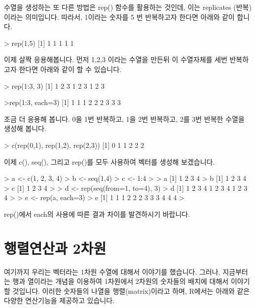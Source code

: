 수열을 생성하는 또 다른 방법은 rep() 함수를 활용하는 것인데, 이는 replicates (반복)이라는 의미입니다.
따라서, 1이라는 숫자를 5 번 반복하고자 한다면 아래와 같이 합니다. 

\begin{Schunk}
\begin{Soutput}
> rep(1,5)
[1] 1 1 1 1 1
\end{Soutput}
\end{Schunk}

이제 살짝 응용해봅니다.  
먼저 1,2,3 이라는 수열을 만든뒤 이 수열자체를 세번 반복하고자 한다면 아래와 같이 할 수 있습니다. 

\begin{Schunk}
\begin{Soutput}
> rep(1:3, 3)
[1] 1 2 3 1 2 3 1 2 3	
\end{Soutput}
\end{Schunk}
>rep(1:3, each=3)
[1] 1 1 1 2 2 2 3 3 3

조금 더 응용해 봅니다. 
0을 1번 반복하고, 1을 2번 반복하고, 2를 3번 반복한 수열을 생성해 봅니다. 

\begin{Schunk}
\begin{Soutput}
> c(rep(0,1), rep(1,2), rep(2,3))
[1] 0 1 1 2 2 2
\end{Soutput}
\end{Schunk}

이제 c(), seq(), 그리고 rep()를 모두 사용하여 벡터를 생성해 보겠습니다.

\begin{Schunk}
\begin{Soutput}
> a <- c(1, 2, 3, 4)
> b <- seq(1,4)
> c <- 1:4
>
> a
[1] 1 2 3 4
> b
[1] 1 2 3 4
> c
[1] 1 2 3 4
>
> d <- rep(seq(from=1, to=4), 3)
> d
[1] 1 2 3 4 1 2 3 4 1 2 3 4
>
> e <- rep(a, each=3)
> e
[1] 1 1 1 2 2 2 3 3 3 4 4 4
>
\end{Soutput}
\end{Schunk}

rep()에서 each의 사용에 따른 결과 차이를 발견하시기 바랍니다.

\section{행렬연산과 2차원}

여기까지 우리는 벡터라는 1차원 수열에 대해서 이야기를 했습니다. 
그러나, 지금부터는 행과 열이라는 개념을 이용하여 1차원에서 2차원의 숫자들의 배치에 대해서 이야기 할 것입니다. 
이러한 숫자들의 나열을 행렬(matrix)이라고 하며, R에서는 아래와 같은 다양한 연산기능을 제공하고 있습니다. 

